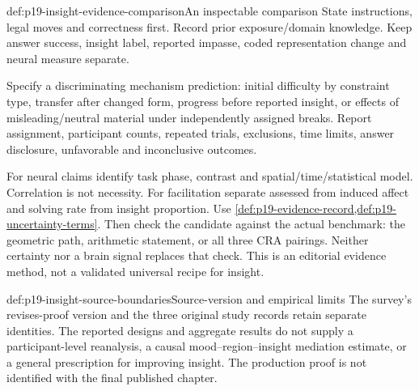 \begin{hbmethod}{def:p19-insight-evidence-comparison}{An inspectable comparison}
State instructions, legal moves and correctness first.
Record prior exposure/domain knowledge.
Keep answer success, insight label, reported impasse, coded representation
change and neural measure separate.

Specify a discriminating mechanism prediction: initial difficulty by constraint
type, transfer after changed form, progress before reported insight, or effects
of misleading/neutral material under independently assigned breaks.
Report assignment, participant counts, repeated trials, exclusions, time limits,
answer disclosure, unfavorable and inconclusive outcomes.

For neural claims identify task phase, contrast and spatial/time/statistical
model. Correlation is not necessity. For facilitation separate assessed from
induced affect and solving rate from insight proportion.
Use \cref{def:p19-evidence-record,def:p19-uncertainty-terms}.
Then check the candidate against the actual benchmark:
the geometric path, arithmetic statement, or all three CRA pairings.
Neither certainty nor a brain signal replaces that check.
This is an editorial evidence method, not a validated universal recipe for insight.
\end{hbmethod}

\begin{proofboundary}{def:p19-insight-source-boundaries}{Source-version and empirical limits}
The survey's revises-proof version and the three original study records
retain separate identities. The reported designs and aggregate results do
not supply a participant-level reanalysis, a causal mood--region--insight
mediation estimate, or a general prescription for improving insight.
The production proof is not identified with the final published chapter.
\end{proofboundary}

